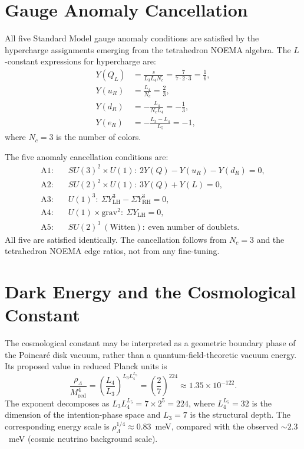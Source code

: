 \documentclass[aps,prd,reprint,twocolumn,showpacs,superscriptaddress]{revtex4-2}
\begin{document}
\section{Gauge Anomaly Cancellation}
\label{sec:anomalies}

All five Standard Model gauge anomaly conditions are satisfied by the
hypercharge assignments emerging from the tetrahedron NOEMA algebra.
The $L$-constant expressions for hypercharge are:
\begin{align}
Y(Q_L) &= \frac{s}{L_3 L_4 N_c}
       = \frac{7}{7 \cdot 2 \cdot 3} = \frac16, \\
Y(u_R) &= \frac{L_4}{N_c} = \frac23, \\
Y(d_R) &= -\frac{L_4}{N_c L_4} = -\frac13, \\
Y(e_R) &= -\frac{L_3 - L_4}{L_5} = -1,
\end{align}
where $N_c = 3$ is the number of colors.

The five anomaly cancellation conditions are:
\begin{align}
\text{A1:}\quad & SU(3)^2 \times U(1):\ 2Y(Q) - Y(u_R) - Y(d_R) = 0,\\
\text{A2:}\quad & SU(2)^2 \times U(1):\ 3Y(Q) + Y(L) = 0,\\
\text{A3:}\quad & U(1)^3:\ \Sigma Y_{\text{LH}}^3 - \Sigma Y_{\text{RH}}^3 = 0,\\
\text{A4:}\quad & U(1) \times \text{grav}^2:\ \Sigma Y_{\text{LH}} = 0,\\
\text{A5:}\quad & SU(2)^3\ (\text{Witten}):\ \text{even number of doublets}.
\end{align}
All five are satisfied identically.  The cancellation follows from
$N_c = 3$ and the tetrahedron NOEMA edge ratios, not from any fine-tuning.

\section{Dark Energy and the Cosmological Constant}
\label{sec:de}

The cosmological constant may be interpreted as a geometric boundary
phase of the Poincar\'{e} disk vacuum, rather than a
quantum-field-theoretic vacuum energy.  Its proposed value in reduced
Planck units is
\begin{equation}
\frac{\rho_\Lambda}{M_{\text{red}}^4}
= \left(\frac{L_4}{L_3}\right)^{L_3 L_4^{L_5}}
= \left(\frac{2}{7}\right)^{224}
\approx 1.35 \times 10^{-122}.
\end{equation}
The exponent decomposes as $L_3 L_4^{L_5} = 7 \times 2^5 = 224$,
where $L_4^{L_5} = 32$ is the dimension of the intention-phase space and
$L_3 = 7$ is the structural depth.  The corresponding energy scale is
$\rho_\Lambda^{1/4} \approx 0.83$~meV, compared with the observed
$\sim 2.3$~meV (cosmic neutrino background scale).
\end{document}

